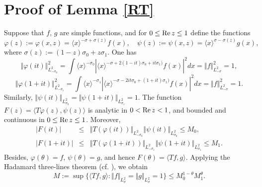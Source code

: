 \documentclass[reqno]{amsart}
\numberwithin{equation}{section}
\begin{document}
\section{Proof of Lemma \ref{RT}}
Suppose that $f$, $g$ are  simple functions, and for $0\le {\rm Re}\, z\le 1$ define the functions 
$$
\varphi(z):=\varphi(x,z)=\langle x\rangle^{-\sigma+\sigma(z)}f(x),
\quad  \psi(z):=\psi(x,z)=\langle x\rangle^{\sigma-\sigma(z)}g(x),
$$
where $\sigma(z):=(1-z)\sigma_0+z\sigma_1$. One has
$$
\Vert\varphi(it)\Vert_{L^2_{-\sigma_0}}^2=
\int \langle x\rangle^{-\sigma_0} |\langle x\rangle^{-\sigma+2(1-it)\sigma_0+it\sigma_1)}f(x)|^2dx
=\Vert f\Vert_{L^2_{-\sigma}}^2=1,
$$
$$
\Vert\varphi(1+it)\Vert_{L^2_{-\sigma_1}}^2=
\int \langle x\rangle^{-\sigma_1} |\langle x\rangle^{-\sigma-2it\sigma_0+(1+it)\sigma_1)}f(x)|^2dx
=\Vert f\Vert_{L^2_{-\sigma}}^2=1.
$$
Similarly,
$\Vert\psi(it)\Vert_{L^2_{\sigma_0}}=\Vert\psi(1+it)\Vert_{L^2_{\sigma_1}}=1$.
The function
$F(z)=\langle T\varphi(z),\psi(z)\rangle$  is  analytic  in $0<  {\rm Re}\, z<1$, and  bounded  and continuous  in  $0\le  {\rm Re}\, z\le 1$.
Moreover,
\begin{eqnarray}\nonumber
|F(it)|&\le& \Vert T (\varphi(it))\Vert_ {L^2_{-\sigma_0}}\Vert\psi(it)\Vert_{L^2_{\sigma_0}}\le M_0,\\
\nonumber
|F(1+it)|&\le& \Vert T (\varphi(1+it))\Vert_ {L^2_{-\sigma_1}}\Vert\psi(1+it)\Vert_{L^2_{\sigma_1}}\le M_1.
\end{eqnarray}
Besides, $\varphi(\theta)=f$, $\psi(\theta)=g$, and hence $F(\theta)=\langle Tf,g\rangle$.
Applying  the Hadamard three-lines theorem (cf. \cite [Lemma 1.1.2]{BL}), we obtain
$$
M:=\sup\{\langle Tf,g\rangle: \Vert f\Vert_{L^2_{\sigma}}=\Vert g\Vert_{L^2_{\sigma}}=1\}\le M_0^{1-\theta}M_1^{\theta}.
$$
\end{document}
